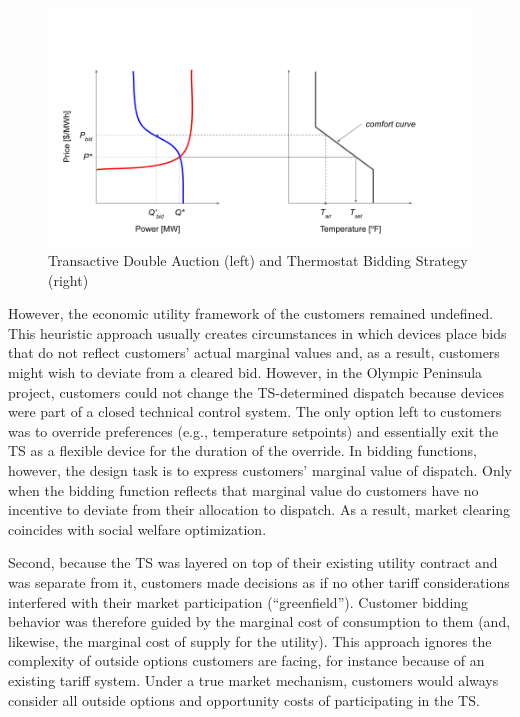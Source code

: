 \begin{figure}[t]
\centering
\includegraphics[scale=0.5]{images/TE_DA.png}
\caption{Transactive Double Auction (left) and Thermostat Bidding Strategy (right)}
\label{fig:Transactive_DA}
\end{figure}

However, the economic utility framework of the customers remained undefined. This heuristic approach usually creates circumstances in which devices place bids that do not reflect customers' actual marginal values and, as a result, customers might wish to deviate from a cleared bid. However, in the Olympic Peninsula project, customers could not change the TS-determined dispatch because devices were part of a closed technical control system. The only option left to customers was to override preferences (e.g., temperature setpoints) and essentially exit the TS as a flexible device for the duration of the override. In bidding functions, however, the design task is to express customers' marginal value of dispatch. Only when the bidding function reflects that marginal value do customers have no incentive to deviate from their allocation to dispatch. As a result, market clearing coincides with social welfare optimization. 

Second, because the TS was layered on top of their existing utility contract and was separate from it, customers made decisions as if no other tariff considerations interfered with their market participation (``greenfield''). Customer bidding behavior was therefore guided by the marginal cost of consumption to them (and, likewise, the marginal cost of supply for the utility). This approach ignores the complexity of outside options customers are facing, for instance because of an existing tariff system. Under a true market mechanism, customers would always consider all outside options and opportunity costs of participating in the TS.

